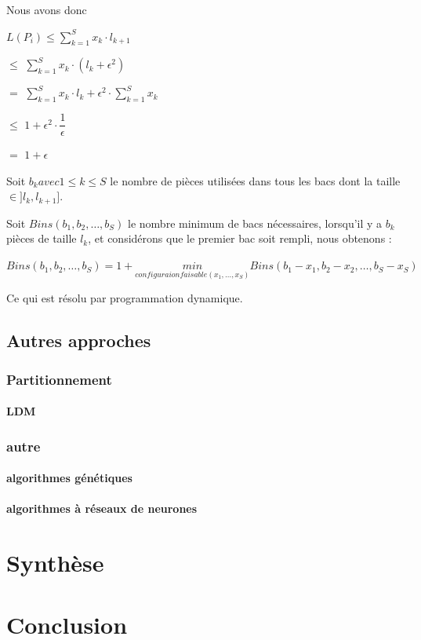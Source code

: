 \documentclass[a4paper,12pt]{report}
\theoremstyle{plain}				%
\theoremstyle{definition}				%
\begin{document}
Nous avons donc 

$L(P_i) \le \sum_{k=1}^{S}x_k \cdot l_{k+1}$
 
$\le$ 
$\sum_{k=1}^{S}x_k \cdot (l_k+\epsilon^2)$ 

$=$ 
$\sum_{k=1}^{S}x_k \cdot l_k  +  \epsilon^2 \cdot \sum_{k=1}^{S}x_k$

$\le$
$1 + \epsilon^2 \cdot \dfrac{1}{\epsilon}$

$=$
$1 + \epsilon$
  
\bigskip
Soit $b_k avec 1 \le k \le S$ le nombre de pièces utilisées dans tous les bacs dont la taille $\in ]l_k, l_{k+1}]$.

Soit $Bins(b_1, b_2, \ldots, b_S)$ le nombre minimum de bacs nécessaires, lorsqu'il y a $b_k$ pièces de taille $l_k$, et considérons que le premier bac soit rempli, nous obtenons :

$Bins(b_1, b_2, \ldots, b_S) = 1 + \underset{configuraion faisable (x_1, \ldots, x_S)}{min} Bins(b_1-x_1, b_2-x_2, \ldots, b_S-x_S)$

Ce qui est résolu par programmation dynamique.
  





\bigskip


\subsection{Autres approches}

\subsubsection{Partitionnement}
\paragraph{LDM}

\subsubsection{autre}
\paragraph{algorithmes génétiques}
\paragraph{algorithmes à réseaux de neurones}






\section{Synthèse}

\section{Conclusion}









\medskip


\end{document}
